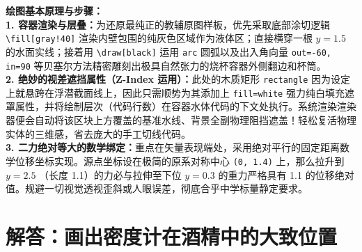 \documentclass[12pt, a4paper]{ctexrep}
\begin{document}
\vspace{0.6cm}

{\small\color{blue!70!black}
\textbf{绘图基本原理与步骤：}\\
\textbf{1. 容器渲染与层叠：}为还原最纯正的教辅原图样板，优先采取底部涂切逻辑 \texttt{\textbackslash fill[gray!40]} 渲染内壁包围的纯灰色区域作为液体区；直接横穿一根 $y=1.5$ 的水面实线；接着用 \texttt{\textbackslash draw[black]} 运用 \texttt{arc} 圆弧以及出入角向量 \texttt{out=-60, in=90} 等贝塞尔方法精密雕刻出极具自然张力的烧杯容器外侧翻边和杯筒。\\
\textbf{2. 绝妙的视差遮挡属性（Z-Index 运用）：}此处的木质矩形 \texttt{rectangle} 因为设定上就悬跨在浮潜截面线上，因此只需顺势为其添加上 \texttt{fill=white} 强力纯白填充遮罩属性，并将绘制层次（代码行数）在容器水体代码的下文处执行。系统渲染渲染器便会自动将该区块上方覆盖的基准水线、背景全副物理阻挡遮盖！轻松复活物理实体的三维感，省去庞大的手工切线代码。\\
\textbf{3. 二力绝对等大的数学绑定：}重点在矢量表现端处，采用绝对平行的固定距离数学位移坐标实现。源点坐标设在极简的原系对称中心 \texttt{(0, 1.4)} 上，那么拉升到 $y=2.5$ （长度 1.1）的力必与拉伸至下位 $y=0.3$ 的重力严格具有 1.1 的位移绝对值。规避一切视觉透视歪斜或人眼误差，彻底合乎中学标量静定要求。
}

\vspace{1.0cm}


\section{解答：画出密度计在酒精中的大致位置}

\vspace{0.6cm}
\end{document}
